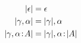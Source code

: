 \framebox{$\im \gamma = \Gamma$}

\begin{align*}
  \lvert \epsilon \rvert                    &= \epsilon \\
  \lvert \gamma, \alpha \rvert            &= \lvert \gamma \rvert, \alpha \\
  \lvert \gamma, \alpha \!:\! A \rvert &= \lvert \gamma \rvert, \alpha \!:\! \lvert A \rvert
\end{align*}